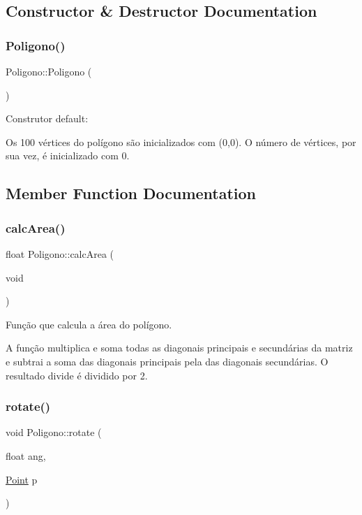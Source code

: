 \subsection{Constructor \& Destructor Documentation}
\mbox{\label{class_poligono_a9311a9a1496878c09c8508b3636e2870}} 
\subsubsection{\texorpdfstring{Poligono()}{Poligono()}}
{\footnotesize\ttfamily Poligono\+::\+Poligono (\begin{DoxyParamCaption}{ }\end{DoxyParamCaption})}



Construtor default\+: 

Os 100 vértices do polígono são inicializados com (0,0). O número de vértices, por sua vez, é inicializado com 0. 

\subsection{Member Function Documentation}
\mbox{\label{class_poligono_a9b2abd1369df82e2fa93a145553de590}} 
\subsubsection{\texorpdfstring{calc\+Area()}{calcArea()}}
{\footnotesize\ttfamily float Poligono\+::calc\+Area (\begin{DoxyParamCaption}\item[{void}]{ }\end{DoxyParamCaption})}



Função que calcula a área do polígono. 

A função multiplica e soma todas as diagonais principais e secundárias da matriz e subtrai a soma das diagonais principais pela das diagonais secundárias. O resultado divide é dividido por 2. \mbox{\label{class_poligono_a2f0b4d5f528fa2e474b991a6806c3eef}} 
\subsubsection{\texorpdfstring{rotate()}{rotate()}}
{\footnotesize\ttfamily void Poligono\+::rotate (\begin{DoxyParamCaption}\item[{float}]{ang,  }\item[{\mbox{\hyperlink{class_point}{Point}}}]{p }\end{DoxyParamCaption})}




